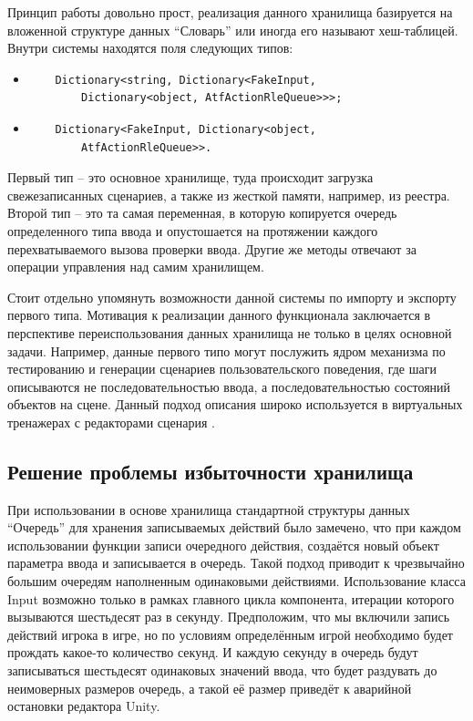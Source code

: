 Принцип работы довольно прост, реализация данного хранилища базируется на вложенной структуре данных ``Словарь'' или иногда его называют хеш-таблицей. Внутри системы находятся поля следующих типов:
\begin{itemize}
	\item 
	\begin{verbatim}
	Dictionary<string, Dictionary<FakeInput, 
		Dictionary<object, AtfActionRleQueue>>>;
	\end{verbatim}
	\item 
	\begin{verbatim}
	Dictionary<FakeInput, Dictionary<object, 
		AtfActionRleQueue>>.
	\end{verbatim}
\end{itemize}

Первый тип -- это основное хранилище, туда происходит загрузка свежезаписанных сценариев, а также из жесткой памяти, например, из реестра. Второй тип -- это та самая переменная, в которую копируется очередь определенного типа ввода и опустошается на протяжении каждого перехватываемого вызова проверки ввода. Другие же методы отвечают за операции управления над самим хранилищем.

Стоит отдельно упомянуть возможности данной системы по импорту и экспорту первого типа. Мотивация к реализации данного функционала заключается в перспективе переиспользования данных хранилища не только в целях основной задачи. Например, данные первого типо могут послужить ядром механизма по тестированию и генерации сценариев пользовательского поведения, где шаги описываются не последовательностью ввода, а последовательностью состояний объектов на сцене. Данный подход описания широко используется в виртуальных тренажерах с редакторами сценария \cite{virtual_trainers}.

\subsection{Решение проблемы избыточности хранилища}
При использовании в основе хранилища стандартной структуры данных ``Очередь'' для хранения записываемых действий было замечено, что при каждом использовании функции записи очередного действия, создаётся новый объект параметра ввода и записывается в очередь. Такой подход приводит к чрезвычайно большим очередям наполненным одинаковыми действиями. Использование класса Input возможно только в рамках главного цикла компонента, итерации которого вызываются шестьдесят раз в секунду. Предположим, что мы включили запись действий игрока в игре, но по условиям определённым игрой необходимо будет прождать какое-то количество секунд. И каждую секунду в очередь будут записываться шестьдесят одинаковых значений ввода, что будет раздувать до неимоверных размеров очередь, а такой её размер приведёт к аварийной остановки редактора Unity.

